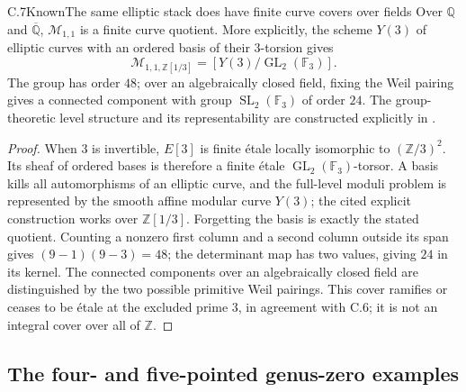\begin{statement}{C.7}{Known}{The same elliptic stack does have finite curve covers over fields}
Over $\mathbb Q$ and $\overline{\mathbb Q}$,
$\mathcal M_{1,1}$ is a finite curve quotient. More explicitly,
the scheme $Y(3)$ of elliptic curves with an ordered basis
of their $3$-torsion gives
\[
 \mathcal M_{1,1,\mathbb Z[1/3]}
       =[Y(3)/\operatorname{GL}_2(\mathbb F_3)].
\]
The group has order $48$; over an algebraically closed field,
fixing the Weil pairing gives a connected component with
group $\operatorname{SL}_2(\mathbb F_3)$ of order $24$.
The group-theoretic level structure and its representability
are constructed explicitly in \citet[\S4; Theorem 7.1]{Bruin2007}.
\end{statement}
\begin{proof}
When $3$ is invertible, $E[3]$ is finite \'etale locally
isomorphic to $(\mathbb Z/3)^2$. Its sheaf of ordered bases
is therefore a finite \'etale
$\operatorname{GL}_2(\mathbb F_3)$-torsor. A basis kills
all automorphisms of an elliptic curve, and the full-level
moduli problem is represented by the smooth affine modular
curve $Y(3)$; the cited explicit construction works over
$\mathbb Z[1/3]$. Forgetting the basis is exactly the stated
quotient. Counting a nonzero first column and a second
column outside its span gives $(9-1)(9-3)=48$; the
determinant map has two values, giving $24$ in its kernel.
The connected components over an algebraically closed field
are distinguished by the two possible primitive Weil
pairings. This cover ramifies or ceases to be \'etale at
the excluded prime $3$, in agreement with C.6; it is not
an integral cover over all of $\mathbb Z$.
\end{proof}

\subsection{The four- and five-pointed genus-zero examples}

